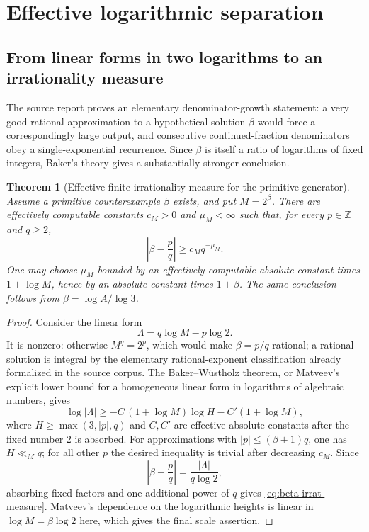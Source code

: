 \documentclass[11pt,oneside]{article}
\newtheorem{theorem}{Theorem}[section]
\theoremstyle{definition}
\theoremstyle{remark}
\newcommand{\Z}{\mathbb Z}
\begin{document}
\section{Effective logarithmic separation}
\label{sec:baker}

\subsection{From linear forms in two logarithms to an irrationality measure}

The source report proves an elementary denominator-growth statement: a very good rational
approximation to a hypothetical solution $\beta$ would force a correspondingly large output,
and consecutive continued-fraction denominators obey a single-exponential recurrence.  Since
$\beta$ is itself a ratio of logarithms of fixed integers, Baker's theory gives a substantially
stronger conclusion.

\begin{theorem}[Effective finite irrationality measure for the primitive generator]
\label{thm:baker-beta}
Assume a primitive counterexample $\beta$ exists, and put $M=2^\beta$.  There are effectively
computable constants $c_M>0$ and $\mu_M<\infty$ such that, for every $p\in\Z$ and $q\ge2$,
\begin{equation}\label{eq:beta-irrat-measure}
  \left|\beta-\frac pq\right|\ge c_Mq^{-\mu_M}.
\end{equation}
One may choose $\mu_M$ bounded by an effectively computable absolute constant times
$1+\log M$, hence by an absolute constant times $1+\beta$.  The same conclusion follows from
$\beta=\log A/\log3$.
\end{theorem}

\begin{proof}
Consider the linear form
\[
  \Lambda=q\log M-p\log2.
\]
It is nonzero: otherwise $M^q=2^p$, which would make $\beta=p/q$ rational; a rational solution
is integral by the elementary rational-exponent classification already formalized in the
source corpus.  The Baker--W\"ustholz theorem, or Matveev's explicit lower bound for a
homogeneous linear form in logarithms of algebraic numbers, gives
\[
  \log|\Lambda|\ge-C\,(1+\log M)\log H-C'(1+\log M),
\]
where $H\ge\max(3,|p|,q)$ and $C,C'$ are effective absolute constants after the fixed number
$2$ is absorbed.  For approximations with $|p|\le(\beta+1)q$, one has $H\ll_Mq$; for all other
$p$ the desired inequality is trivial after decreasing $c_M$.  Since
\[
  \left|\beta-\frac pq\right|=\frac{|\Lambda|}{q\log2},
\]
absorbing fixed factors and one additional power of $q$ gives
\eqref{eq:beta-irrat-measure}.  Matveev's dependence on the logarithmic heights is linear in
$\log M=\beta\log2$ here, which gives the final scale assertion.
\end{proof}
\end{document}
